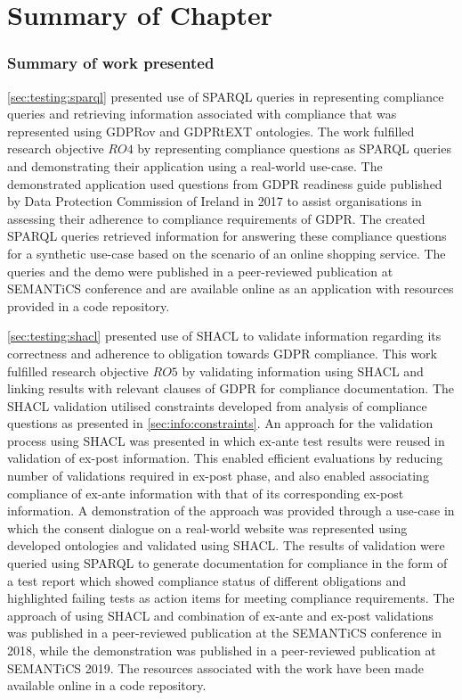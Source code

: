 \section{Summary of Chapter}\label{sec:testing:conclusion}

\subsubsection*{Summary of work presented}
\autoref{sec:testing:sparql} presented use of SPARQL queries in representing compliance queries and retrieving information associated with compliance that was represented using GDPRov and GDPRtEXT ontologies.
The work fulfilled research objective $RO4$ by representing compliance questions as SPARQL queries and demonstrating their application using a real-world use-case.
The demonstrated application used questions from GDPR readiness guide published by Data Protection Commission of Ireland in 2017 to assist organisations in assessing their adherence to compliance requirements of GDPR.
The created SPARQL queries retrieved information for answering these compliance questions for a synthetic use-case based on the scenario of an online shopping service.
The queries and the demo were published in a peer-reviewed publication \cite{pandit_queryable_2018} at SEMANTiCS conference and are available online as an application with resources provided in a code repository.

\autoref{sec:testing:shacl} presented use of SHACL to validate information regarding its correctness and adherence to obligation towards GDPR compliance.
This work fulfilled research objective $RO5$ by validating information using SHACL and linking results with relevant clauses of GDPR for compliance documentation.
The SHACL validation utilised constraints developed from analysis of compliance questions as presented in \autoref{sec:info:constraints}.
An approach for the validation process using SHACL was presented in which ex-ante test results were reused in validation of ex-post information. This enabled efficient evaluations by reducing number of validations required in ex-post phase, and also enabled associating compliance of ex-ante information with that of its corresponding ex-post information.
A demonstration of the approach was provided through a use-case in which the consent dialogue on a real-world website was represented using developed ontologies and validated using SHACL.
The results of validation were queried using SPARQL to generate documentation for compliance in the form of a test report which showed compliance status of different obligations and highlighted failing tests as action items for meeting compliance requirements.
The approach of using SHACL and combination of ex-ante and ex-post validations was published in a peer-reviewed publication \cite{pandit_towards_2018} at the SEMANTiCS conference in 2018, while the demonstration was published in a peer-reviewed publication \cite{pandit_test-driven_2019} at SEMANTiCS 2019.
The resources associated with the work have been made available online in a code repository.

